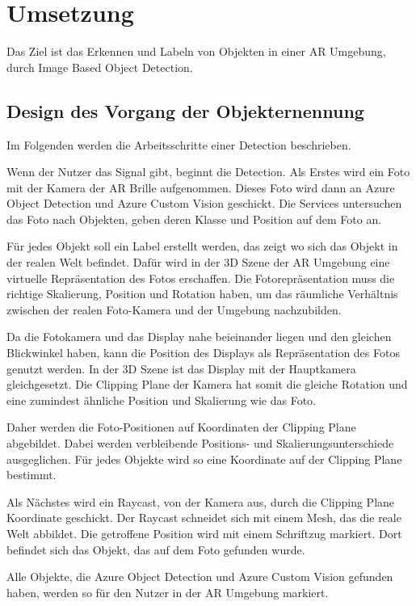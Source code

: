 \newpage
\section{Umsetzung}

Das Ziel ist das Erkennen und Labeln von Objekten in einer AR Umgebung, durch Image Based Object Detection.

\subsection{Design des Vorgang der Objekternennung}

Im Folgenden werden die Arbeitsschritte einer Detection beschrieben.

Wenn der Nutzer das Signal gibt, beginnt die Detection. Als Erstes wird ein Foto mit der Kamera der AR Brille aufgenommen. 
Dieses Foto wird dann an Azure Object Detection und Azure Custom Vision geschickt. 
Die Services untersuchen das Foto nach Objekten, geben deren Klasse und Position auf dem Foto an.

Für jedes Objekt soll ein Label erstellt werden, das zeigt wo sich das Objekt in der realen Welt befindet.
Dafür wird in der 3D Szene der AR Umgebung eine virtuelle Repräsentation des Fotos erschaffen. Die Fotorepräsentation muss die richtige Skalierung, Position und Rotation haben, um das räumliche Verhältnis zwischen der realen Foto-Kamera und der Umgebung nachzubilden.

Da die Fotokamera und das Display nahe beieinander liegen und den gleichen Blickwinkel haben, kann die Position des Displays als Repräsentation des Fotos genutzt werden. In der 3D Szene ist das Display mit der Hauptkamera gleichgesetzt. Die Clipping Plane der Kamera hat somit die gleiche Rotation und eine zumindest ähnliche Position und Skalierung wie das Foto. 

Daher werden die Foto-Positionen auf Koordinaten der Clipping Plane abgebildet. Dabei werden verbleibende Positions- und Skalierungsunterschiede ausgeglichen. Für jedes Objekte wird so eine Koordinate auf der Clipping Plane bestimmt. 

Als Nächstes wird ein Raycast, von der Kamera aus, durch die Clipping Plane Koordinate geschickt. Der Raycast schneidet sich mit einem Mesh, das die reale Welt abbildet. Die getroffene Position wird mit einem Schriftzug markiert. Dort befindet sich das Objekt, das auf dem Foto gefunden wurde.

Alle Objekte, die Azure Object Detection und Azure Custom Vision gefunden haben, werden so für den Nutzer in der AR Umgebung markiert.

